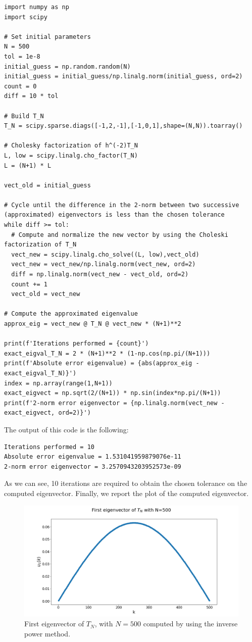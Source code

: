 \documentclass[a4paper,11pt]{article}
\begin{document}
\begin{verbatim}
import numpy as np
import scipy

# Set initial parameters
N = 500
tol = 1e-8
initial_guess = np.random.random(N)
initial_guess = initial_guess/np.linalg.norm(initial_guess, ord=2)
count = 0
diff = 10 * tol

# Build T_N
T_N = scipy.sparse.diags([-1,2,-1],[-1,0,1],shape=(N,N)).toarray()

# Cholesky factorization of h^(-2)T_N
L, low = scipy.linalg.cho_factor(T_N)
L = (N+1) * L

vect_old = initial_guess

# Cycle until the difference in the 2-norm between two successive (approximated) eigenvectors is less than the chosen tolerance
while diff >= tol:
  # Compute and normalize the new vector by using the Choleski factorization of T_N
  vect_new = scipy.linalg.cho_solve((L, low),vect_old)
  vect_new = vect_new/np.linalg.norm(vect_new, ord=2)
  diff = np.linalg.norm(vect_new - vect_old, ord=2)
  count += 1
  vect_old = vect_new

# Compute the approximated eigenvalue
approx_eig = vect_new @ T_N @ vect_new * (N+1)**2

print(f'Iterations performed = {count}')
exact_eigval_T_N = 2 * (N+1)**2 * (1-np.cos(np.pi/(N+1)))
print(f'Absolute error eigenvalue) = {abs(approx_eig - exact_eigval_T_N)}')
index = np.array(range(1,N+1))
exact_eigvect = np.sqrt(2/(N+1)) * np.sin(index*np.pi/(N+1))
print(f'2-norm error eigenvector = {np.linalg.norm(vect_new - exact_eigvect, ord=2)}')
\end{verbatim}

\noindent The output of this code is the following:
\begin{verbatim}
Iterations performed = 10
Absolute error eigenvalue = 1.531041959879076e-11
2-norm error eigenvector = 3.2570943203952573e-09
\end{verbatim}

\noindent As we can see, 10 iterations are required to obtain the chosen tolerance on the computed eigenvector. Finally, we report the plot of the computed eigenvector.
\begin{figure}[H]
	\centering
	\includegraphics[scale=0.40]{Plot/First_eigvect_tn_n=500.png}
	\caption{First eigenvector of $T_{N}$, with $N=500$ computed by using the inverse power method.}
	\label{Fig:First_eigvect_Tn}
\end{figure}
\end{document}

